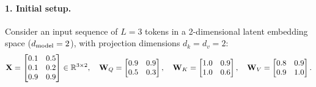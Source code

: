 \documentclass[../../main.tex]{subfiles}
\begin{document}
\paragraph{1. Initial setup.}
Consider an input sequence of $L = 3$ tokens in a 2-dimensional latent embedding space ($d_{\text{model}} = 2$), with projection dimensions $d_k = d_v = 2$:
\begin{equation}
\mathbf{X} = \begin{bmatrix}
0.1 & 0.5 \\
0.1 & 0.2 \\
0.9 & 0.9
\end{bmatrix} \in \mathbb{R}^{3 \times 2}, \quad
\mathbf{W}_Q = \begin{bmatrix}
0.9 & 0.9 \\
0.5 & 0.3
\end{bmatrix}, \quad
\mathbf{W}_K = \begin{bmatrix}
1.0 & 0.9 \\
1.0 & 0.6
\end{bmatrix}, \quad
\mathbf{W}_V = \begin{bmatrix}
0.8 & 0.9 \\
0.9 & 1.0
\end{bmatrix}.
\end{equation}
\end{document}
